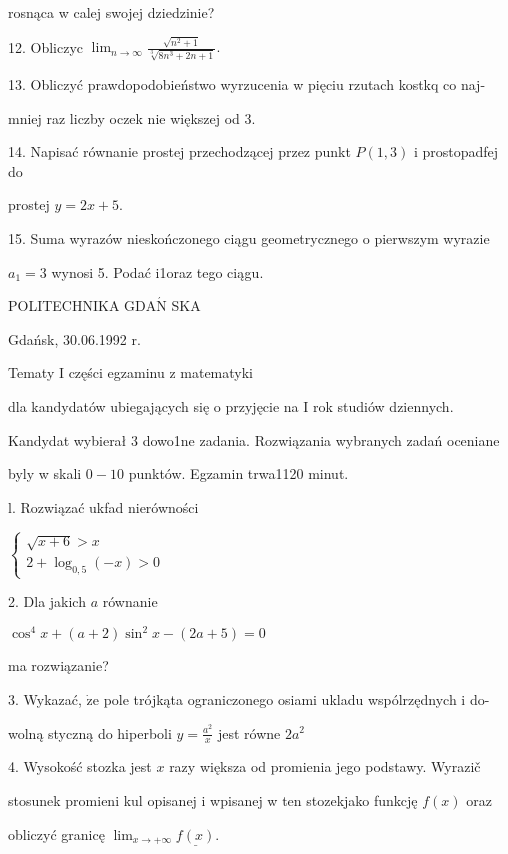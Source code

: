 \documentclass[a4paper,12pt]{article}
\begin{document}
rosnąca w calej swojej dziedzinie?

12. Obliczyc $\displaystyle \lim_{n\rightarrow\infty}\frac{\sqrt{n^{2}+1}}{\sqrt[3]{8n^{3}+2n+1}}.$

13. Obliczyć prawdopodobieństwo wyrzucenia w pięciu rzutach kostkq co naj-

mniej raz liczby oczek nie większej od 3.

14. Napisać równanie prostej przechodzącej przez punkt $P(1,3)$ i prostopadfej do

prostej $y=2x+5.$

15. Suma wyrazów nieskończonego ciągu geometrycznego o pierwszym wyrazie

$a_{1}=3$ wynosi 5. Podać i1oraz tego ciągu.







POLITECHNIKA $\mathrm{G}\mathrm{D}\mathrm{A}\acute{\mathrm{N}}$ SKA

Gdańsk, 30.06.1992 r.

Tematy I części egzaminu z matematyki

dla kandydatów ubiegających się o przyjęcie na I rok studiów dziennych.

Kandydat wybierał 3 dowo1ne zadania. Rozwiązania wybranych zadań oceniane

byly w skali $0-10$ punktów. Egzamin trwa1120 minut.

l. Rozwiązać ukfad nierówności

$\left\{\begin{array}{l}
\sqrt{x+6}>x\\
2+\log_{0,5}(-x)>0
\end{array}\right.$

2. Dla jakich $a$ równanie

$\cos^{4}x+(a+2)\sin^{2}x-(2a+5)=0$

ma rozwiązanie?

3. Wykazać, $\dot{\mathrm{z}}\mathrm{e}$ pole trójkąta ograniczonego osiami ukladu wspólrzędnych i do-

wolną styczną do hiperboli $y=\displaystyle \frac{a^{2}}{x}$ jest równe $2a^{2}$

4. Wysokość stozka jest $x$ razy większa od promienia jego podstawy. Wyrazič

stosunek promieni kul opisanej i wpisanej w ten stozekjako funkcję $f(x)$ oraz

obliczyć granicę $\displaystyle \lim_{x\rightarrow+\infty} \underline{f(x)}.$
\end{document}
